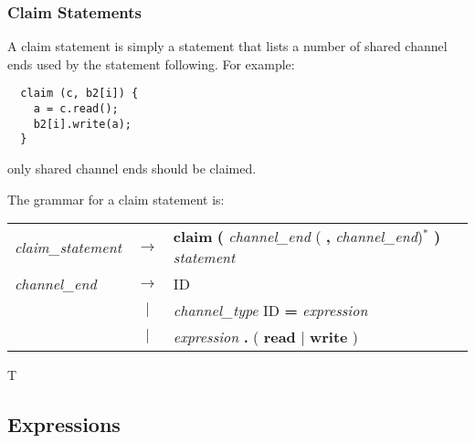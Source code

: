 \documentclass[pdflatex,11pt,letter]{article}
\begin{document}
\subsubsection{Claim Statements}
\label{sec:claimStatement}

A claim statement is simply a statement that lists a number of shared channel ends used by the statement following. For example:

\begin{verbatim}
  claim (c, b2[i]) {
    a = c.read();
    b2[i].write(a);
  }
\end{verbatim}
only shared channel ends should be claimed.

The grammar for a claim statement is:

\begin{center}
	\begin{tabular}{lcl}
		{\it claim\_statement} & $\rightarrow$ & {\bf claim} {\bf (} {\it channel\_end} ( {\bf ,} {\it channel\_end})$^*$ {\bf )} {\it statement}\\
		{\it channel\_end} & $\rightarrow$ & ID \\
		& $\mid$ & {\it channel\_type} ID {\bf =} {\it expression}\\
		& $\mid$ & {\it expression} {\bf .} ( {\bf read} $\mid$ {\bf write} )\\
    \end{tabular}
\end{center} 
  
 T
  

\subsection{Expressions}
 
\subsubsection{}

 
 
 
\end{document}
